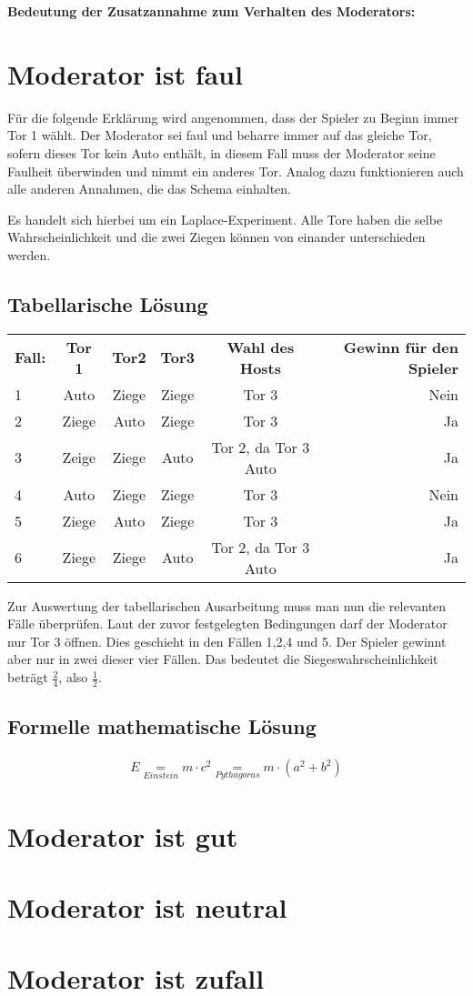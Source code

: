 \textbf{Bedeutung der Zusatzannahme zum Verhalten des Moderators:}

\section{Moderator ist faul}

Für die folgende Erklärung wird angenommen, dass der Spieler zu Beginn immer Tor 1 wählt. Der Moderator sei faul und beharre immer auf das gleiche Tor, sofern dieses
Tor kein Auto enthält, in diesem Fall muss der Moderator seine Faulheit überwinden und nimmt ein anderes Tor. Analog dazu funktionieren auch alle anderen Annahmen,
die das Schema einhalten.

Es handelt sich hierbei um ein Laplace-Experiment. Alle Tore haben die selbe Wahrscheinlichkeit und die zwei Ziegen können von einander unterschieden werden. 

\subsection{Tabellarische Lösung}


\begin{tabular}[h]{lccccr}
    \textbf{Fall:} & \textbf{Tor 1} & \textbf{Tor2} & \textbf{Tor3} & \textbf{Wahl des Hosts} & \textbf{Gewinn für den Spieler} \\
    1 & Auto & Ziege & Ziege & Tor 3 & Nein\\
    2 & Ziege & Auto & Ziege & Tor 3 & Ja\\
    3 & Zeige & Ziege & Auto & Tor 2, da Tor 3 Auto & Ja\\
    4 & Auto & Ziege & Ziege & Tor 3 & Nein\\
    5 & Ziege & Auto & Ziege & Tor 3 & Ja\\
    6 & Ziege & Ziege & Auto & Tor 2, da Tor 3 Auto & Ja\\
\end{tabular}

Zur Auswertung der tabellarischen Ausarbeitung muss man nun die relevanten Fälle überprüfen. Laut der zuvor festgelegten Bedingungen darf der Moderator nur Tor 3 öffnen.
Dies geschieht in den Fällen 1,2,4 und 5. Der Spieler gewinnt aber nur in zwei dieser vier Fällen. Das bedeutet die Siegeswahrscheinlichkeit beträgt $\frac{2}{4}$,
also $\frac{1}{2}$.
\subsection{Formelle mathematische Lösung}

\begin{align}
    E \underset{Einstein}{=} m \cdot c^2
    \underset{Pythagoras}{=} m \cdot (a^2 + b^2)
\end{align}

\section{Moderator ist gut}

\section{Moderator ist neutral}

\section{Moderator ist zufall}